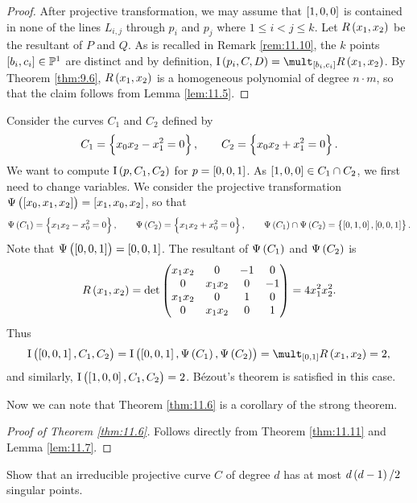 \begin{proof}
After projective transformation, we may assume that $ \sbr{1, 0, 0} $ is contained in none of the lines $ L_{i, j} $ through $ p_i $ and $ p_j $ where $ 1 \le i < j \le k $. Let $ R\br{x_1, x_2} $ be the resultant of $ P $ and $ Q $. As is recalled in Remark \ref{rem:11.10}, the $ k $ points $ \sbr{b_i, c_i} \in \PP^1 $ are distinct and by definition, $ \I\br{p_i, C, D} = \mult_{\sbr{b_i, c_i}} R\br{x_1, x_2} $. By Theorem \ref{thm:9.6}, $ R\br{x_1, x_2} $ is a homogeneous polynomial of degree $ n \cdot m $, so that the claim follows from Lemma \ref{lem:11.5}.
\end{proof}


\begin{example}
Consider the curves $ C_1 $ and $ C_2 $ defined by
$$ C_1 = \cbr{x_0x_2 - x_1^2 = 0}, \qquad C_2 = \cbr{x_0x_2 + x_1^2 = 0}. $$
We want to compute $ \I\br{p, C_1, C_2} $ for $ p = \sbr{0, 0, 1} $. As $ \sbr{1, 0, 0} \in C_1 \cap C_2 $, we first need to change variables. We consider the projective transformation $ \Psi\br{\sbr{x_0, x_1, x_2}} = \sbr{x_1, x_0, x_2} $, so that
$$ \Psi\br{C_1} = \cbr{x_1x_2 - x_0^2 = 0}, \qquad \Psi\br{C_2} = \cbr{x_1x_2 + x_0^2 = 0}, \qquad \Psi\br{C_1} \cap \Psi\br{C_2} = \cbr{\sbr{0, 1, 0}, \sbr{0, 0, 1}}. $$
Note that $ \Psi\br{\sbr{0, 0, 1}} = \sbr{0, 0, 1} $. The resultant of $ \Psi\br{C_1} $ and $ \Psi\br{C_2} $ is
$$ R\br{x_1, x_2} = \det
\begin{pmatrix}
x_1x_2 & 0 & -1 & 0 \\
0 & x_1x_2 & 0 & -1 \\
x_1x_2 & 0 & 1 & 0 \\
0 & x_1x_2 & 0 & 1
\end{pmatrix}
= 4x_1^2x_2^2. $$
Thus
$$ \I\br{\sbr{0, 0, 1}, C_1, C_2} = \I\br{\sbr{0, 0, 1}, \Psi\br{C_1}, \Psi\br{C_2}} = \mult_{\sbr{0, 1}} R\br{x_1, x_2} = 2, $$
and similarly, $ \I\br{\sbr{1, 0, 0}, C_1, C_2} = 2 $. B\'ezout's theorem is satisfied in this case.
\end{example}

Now we can note that Theorem \ref{thm:11.6} is a corollary of the strong theorem.

\begin{proof}[Proof of Theorem \ref{thm:11.6}]
Follows directly from Theorem \ref{thm:11.11} and Lemma \ref{lem:11.7}.
\end{proof}

\begin{exercise**}
Show that an irreducible projective curve $ C $ of degree $ d $ has at most $ d\br{d - 1} / 2 $ singular points.
\end{exercise**}

